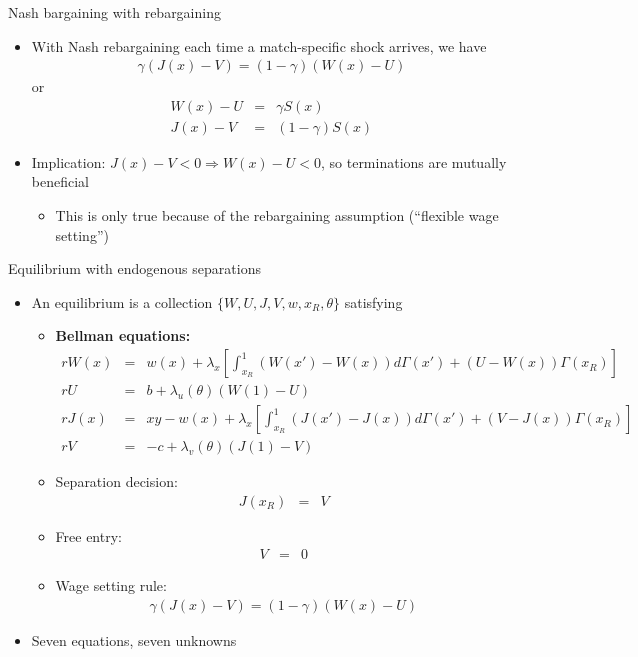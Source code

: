 \documentclass[9pt]{beamer}
\newcommand{\bit}{\begin{itemize}}
\newcommand{\eit}{\end{itemize}}
\begin{document}
\begin{frame}{Nash bargaining with rebargaining}

\bit
\setlength\itemsep{1.5em}

\item With Nash rebargaining each time a match-specific shock arrives, we have
\begin{eqnarray}
\gamma (J(x)-V) = (1-\gamma) (W(x)-U) \nonumber
\end{eqnarray}
or
\begin{eqnarray*}
	W(x)-U &=& \gamma S(x) \\
	J(x)-V &=& (1-\gamma) S(x)
\end{eqnarray*}

\item Implication: $J(x)-V<0 \Rightarrow W(x)-U<0$, so terminations are mutually beneficial
\bit
	\item This is only true because of the rebargaining assumption (``flexible wage setting'')
\eit


\eit
\end{frame}


\begin{frame}{Equilibrium with endogenous separations}

\bit
\setlength\itemsep{1em}

\item An equilibrium is a collection $\{W,U, J, V, w, x_R, \theta\}$ satisfying
\bit
\item \bf Bellman equations:
\begin{eqnarray}
rW(x) &=& w(x)  + \lambda_x \left[ \int_{x_R}^{1} (W(x')-W(x)) d\Gamma (x') + (U-W(x))\Gamma (x_R)  \right] \nonumber \\ 
rU &=& b  + \lambda_u(\theta) \left(W(1)-U\right) \nonumber \\
rJ(x) &=& xy - w(x)+\lambda_x \left[ \int_{x_R}^{1} (J(x')-J(x)) d\Gamma (x') + (V-J(x))\Gamma (x_R)  \right] \nonumber \\
rV &=& -c +\lambda_v(\theta)\left(J(1)-V\right) \nonumber
\end{eqnarray}

\item Separation decision:
\begin{eqnarray}
J(x_R) &=& V \nonumber 
\end{eqnarray}

\item Free entry:
\begin{eqnarray}
V &=& 0 \nonumber 
\end{eqnarray}

\item Wage setting rule: \normalfont
\begin{eqnarray}
\gamma (J(x)-V) = (1-\gamma) (W(x)-U) \nonumber
\end{eqnarray}
\eit

\item Seven equations, seven unknowns
\eit
\end{frame}
\end{document}

